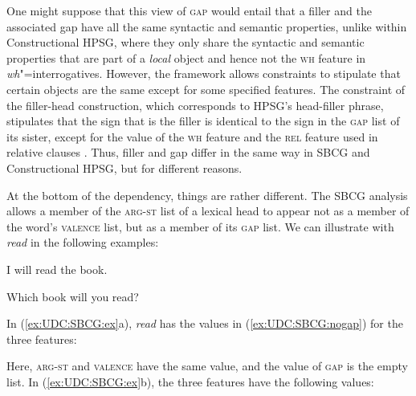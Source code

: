 \documentclass[output=paper,biblatex,babelshorthands,newtxmath,draftmode,colorlinks,citecolor=brown]{langscibook}
\begin{document}
One might suppose that this view of \textsc{gap} would entail that a
filler and the associated gap have all the same syntactic and semantic
properties, unlike within Constructional HPSG, where they only
share the syntactic and semantic properties that are part of a
\textit{local} object and hence not the \textsc{wh} feature in
\emph{wh}"=interrogatives. However, the framework allows constraints
to stipulate that certain objects are the same except for some
specified features. The constraint of the filler-head construction,
which corresponds to HPSG’s head-filler phrase, stipulates that the
sign that is the filler is identical to the sign in the \textsc{gap}
list of its sister, except for the value of the \textsc{wh} feature
and the \textsc{rel} feature used in relative clauses \citep[]{Sag:12}. Thus, filler
and gap differ in the same way in SBCG and Constructional HPSG,
but for different reasons.

At the bottom of the dependency, things are rather different. The SBCG
analysis allows a member of the \textsc{arg-st} list of a lexical head
to appear not as a member of the word’s \textsc{valence} list, but as
a member of its \textsc{gap} list. We can illustrate with
\textit{read} in the following examples:

\begin{exe}
  \ex \label{ex:UDC:SBCG:ex}
  \begin{xlist}
    \ex I will read the book.
    
    \ex Which book will you read?
  \end{xlist}

\end{exe}

\noindent
In (\ref{ex:UDC:SBCG:ex}a), \textit{read} has the values in
(\ref{ex:UDC:SBCG:nogap}) for the three features:

\begin{exe}
  \ex \label{ex:UDC:SBCG:nogap}

\end{exe}

\noindent
Here, \textsc{arg-st} and \textsc{valence} have the same value, and
the value of \textsc{gap} is the empty list. In
(\ref{ex:UDC:SBCG:ex}b), the three features have the following values:
\end{document}
